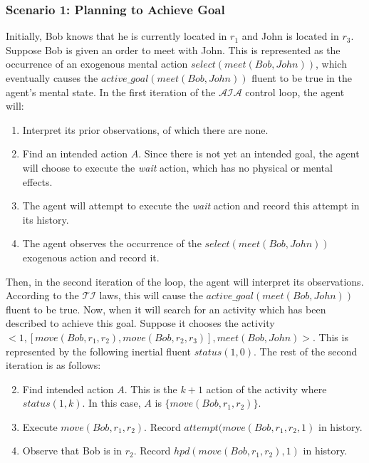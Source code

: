 \subsubsection{Scenario 1: Planning to Achieve Goal~\citep{blount_towards_2014}}
\label{subsubsec:aia_scenario_1}

Initially, Bob knows that he is currently located in $r_1$ and John is located in $r_3$.
Suppose Bob is given an order to meet with John.
This is represented as the occurrence of an exogenous mental action $select(meet(Bob, John))$, which eventually causes the $active\_goal(meet(Bob, John))$ fluent to be true in the agent's mental state.
In the first iteration of the $\mathcal{AIA}$ control loop, the agent will:

\begin{enumerate}
    \item Interpret its prior observations, of which there are none.
    \item Find an intended action $A$.
        Since there is not yet an intended goal, the agent will choose to execute the \textit{wait} action, which has no physical or mental effects.
    \item The agent will attempt to execute the \textit{wait} action and record this attempt in its history.
    \item The agent observes the occurrence of the $select(meet(Bob, John))$ exogenous action and record it.
\end{enumerate}

Then, in the second iteration of the loop, the agent will interpret its observations.
According to the $\mathcal{TI}$ laws, this will cause the $active\_goal(meet(Bob, John))$ fluent to be true.
Now, when it will search for an activity which has been described to achieve this goal.
Suppose it chooses the activity $<1, [move(Bob, r_1,r_2), move(Bob, r_2, r_3)],meet(Bob,John)>$.
This is represented by the following inertial fluent $status(1,0)$.
The rest of the second iteration is as follows:

\begin{enumerate}
    \setcounter{enumi}{1}
    \item Find intended action $A$.
        This is the $k + 1$ action of the activity where $status(1, k)$.
        In this case, $A$ is $\{move(Bob, r_1, r_2)\}$.
    \item Execute $move(Bob, r_1, r_2)$.
        Record $attempt(move(Bob, r_1, r_2, 1)$ in history.
    \item Observe that Bob is in $r_2$.
        Record $hpd(move(Bob, r_1, r_2),1)$ in history.
\end{enumerate}

